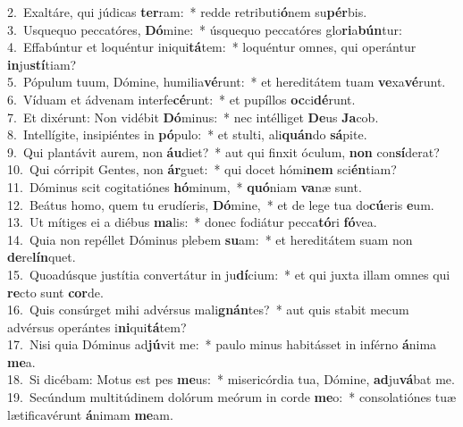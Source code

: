 {2.~}Exaltáre, qui júdicas \textbf{ter}ram:~* redde retributi\textbf{ó}nem su\textbf{pér}bis.\\
{3.~}Usquequo peccatóres, \textbf{Dó}mine:~* úsquequo peccatóres glo\textbf{ri}a\textbf{bún}tur:\\
{4.~}Effabúntur et loquéntur iniqui\textbf{tá}tem:~* loquéntur omnes, qui operántur \textbf{in}ju\textbf{stí}tiam?\\
{5.~}Pópulum tuum, Dómine, humilia\textbf{vé}runt:~* et hereditátem tuam \textbf{ve}xa\textbf{vé}runt.\\
{6.~}Víduam et ádvenam interfe\textbf{cé}runt:~* et pupíllos \textbf{oc}ci\textbf{dé}runt.\\
{7.~}Et dixérunt: Non vidébit \textbf{Dó}minus:~* nec intélliget \textbf{De}us \textbf{Ja}cob.\\
{8.~}Intellígite, insipiéntes in \textbf{pó}pulo:~* et stulti, ali\textbf{quán}do \textbf{sá}pite.\\
{9.~}Qui plantávit aurem, non \textbf{áu}diet?~* aut qui finxit óculum, \textbf{non} con\textbf{sí}derat?\\
{10.~}Qui córripit Gentes, non \textbf{ár}guet:~* qui docet hómi\textbf{nem} sci\textbf{én}tiam?\\
{11.~}Dóminus scit cogitatiónes \textbf{hó}minum,~* \textbf{quó}niam \textbf{va}næ sunt.\\
{12.~}Beátus homo, quem tu erudíeris, \textbf{Dó}mine,~* et de lege tua do\textbf{cú}eris \textbf{e}um.\\
{13.~}Ut mítiges ei a diébus \textbf{ma}lis:~* donec fodiátur pecca\textbf{tó}ri \textbf{fó}vea.\\
{14.~}Quia non repéllet Dóminus plebem \textbf{su}am:~* et hereditátem suam non \textbf{de}re\textbf{lín}quet.\\
{15.~}Quoadúsque justítia convertátur in ju\textbf{dí}cium:~* et qui juxta illam omnes qui \textbf{re}cto sunt \textbf{cor}de.\\
{16.~}Quis consúrget mihi advérsus mali\textbf{gnán}tes?~* aut quis stabit mecum advérsus operántes i\textbf{ni}qui\textbf{tá}tem?\\
{17.~}Nisi quia Dóminus ad\textbf{jú}vit me:~* paulo minus habitásset in inférno \textbf{á}nima \textbf{me}a.\\
{18.~}Si dicébam: Motus est pes \textbf{me}us:~* misericórdia tua, Dómine, \textbf{ad}ju\textbf{vá}bat me.\\
{19.~}Secúndum multitúdinem dolórum meórum in corde \textbf{me}o:~* consolatiónes tuæ lætificavérunt \textbf{á}nimam \textbf{me}am.\\
